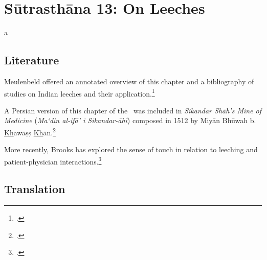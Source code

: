 

\chapter{Sūtrasthāna 13:  On Leeches}
a

\section{Literature} 


Meulenbeld offered an annotated overview of this chapter and a bibliography
of studies on Indian leeches and their application.\footcite[IA, 209; IB,
324, n.\,131]{meul-hist}

A Persian version of this chapter of the \SS\ was included in \emph{Sikandar
    Shāh's Mine of Medicine} (\emph{Ma`din al-ifā' i
    Sikandar-āhī}) composed in 1512 by Miyān Bhūwah b.
\underline{Kh}awāṣṣ \underline{Kh}ān.\footcites[96--109]{sidd-1959}
{azee-1971} [231--232]{stor-1971} [IB, 324,
n.\,128]{meul-hist}[8--9]{spez-2019}

More recently, Brooks has explored the sense of touch in relation to
leeching and patient-physician
interactions.\footcite{%
    broo-2020,
    broo-2020b,
    broo-2020c,
    broo-2021}

\section{Translation}

